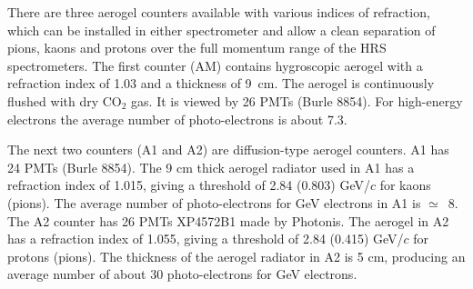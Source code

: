 There are  three aerogel \Cherenkov{} counters available with various indices
of refraction, which can be installed in either spectrometer and allow 
a clean separation of pions, kaons and protons over the full momentum 
range of the HRS spectrometers.
The first counter (AM) contains hygroscopic aerogel with a refraction 
index of 1.03 and a thickness of 9~cm. 
The aerogel is continuously flushed with dry CO$_{2}$ gas.  
It is viewed by 26 PMTs (Burle 8854). 
For high-energy electrons the average number of photo-electrons is about 7.3. 

The next two counters (A1 and A2) are diffusion-type aerogel 
counters. A1 has 24 PMTs (Burle 8854). 
The 9 cm thick aerogel radiator used in A1 has a refraction index of 1.015, 
giving a threshold of 2.84 (0.803) GeV/$c$ for kaons (pions). 
The average number of photo-electrons for GeV electrons 
in A1 is $\simeq$~8. The A2 counter has 26 PMTs XP4572B1 made by Photonis. 
The aerogel in A2 has a refraction index of 1.055, 
giving a threshold of 2.84 (0.415) GeV/$c$ for protons (pions). 
The thickness of the aerogel radiator in A2 is 5 cm, producing an average 
number of about 30 photo-electrons for GeV electrons.

